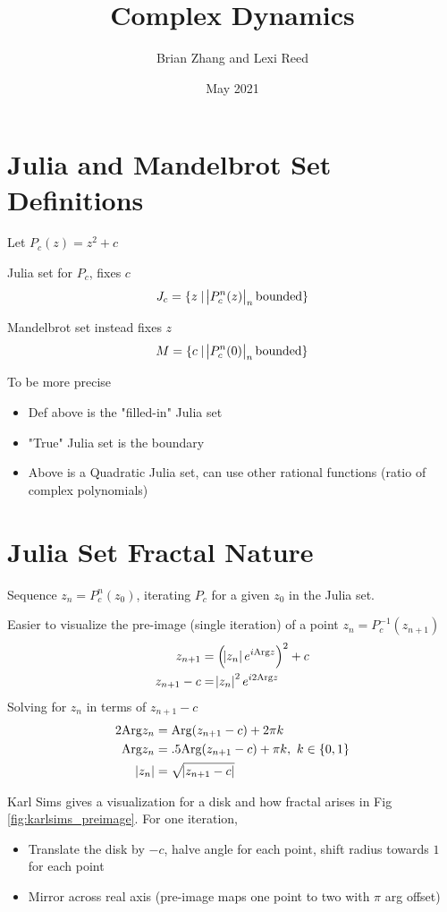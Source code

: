 \documentclass{article}
\title{Complex Dynamics}
\author{Brian Zhang and Lexi Reed}
\date{May 2021}
\begin{document}
\maketitle

\section{Julia and Mandelbrot Set Definitions}

Let $P_c(z) = z^2 + c$

Julia set for $P_c$, fixes $c$
\[ J_c = \{ z \mid  \abs{ P_c^n(z) }_n \textrm{bounded} \} \] 


Mandelbrot set instead fixes $z$
\[ M = \{ c \mid \abs{ P_c^n(0) }_n \textrm{bounded} \} \]

To be more precise
\begin{itemize}
    \item Def above is the "filled-in" Julia set
    \item "True" Julia set is the boundary
    \item Above is a Quadratic Julia set, can use other rational functions (ratio of complex polynomials)
\end{itemize}


\section{Julia Set Fractal Nature}

Sequence $z_n = P_c^n(z_0)$, iterating $P_c$ for a given $z_0$ in the Julia set.

Easier to visualize the pre-image (single iteration) of a point $z_n = P_c^{-1}(z_{n + 1})$
\begin{align*}
    z_{n + 1} &= \left( \abs{z_n}e^{i\text{Arg}{z}}\right)^2 + c \\
    z_{n + 1} - c &= \abs{z_n}^2e^{i2\text{Arg}{z}}
\end{align*}
Solving for $z_n$ in terms of $z_{n+1} - c$
\begin{align*}
    2\text{Arg}{z_n} &= \text{Arg}(z_{n+1} - c) + 2\pi k \\
    \text{Arg}{z_n} &= .5 \text{Arg}(z_{n+1} - c) + \pi k,\ k \in \{0, 1\} \\
    \abs{z_n} &= \sqrt{\abs{z_{n+1} - c}}
\end{align*}

Karl Sims gives a visualization for a disk and how fractal arises in Fig \ref{fig:karlsims_preimage}. For one iteration,
\begin{itemize}
    \item Translate the disk by $-c$, halve angle for each point, shift radius towards $1$ for each point
    \item Mirror across real axis (pre-image maps one point to two with $\pi$ arg offset)
\end{itemize}
\end{document}
